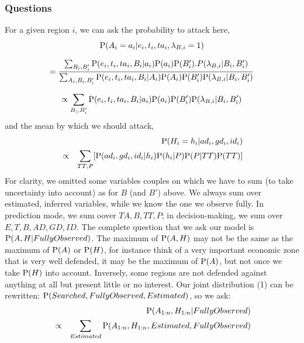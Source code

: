 \subsubsection{Questions}
For a given region $i$, we can ask the probability to attack here,
\begin{equation}
\mathrm{P}(A_i=a_i|e_i,t_i,ta_i,\lambda_{B,i}=1)
\end{equation}
\vspace{-0.2cm}
\begin{small}
\begin{equation}
= \frac{\sum_{B_i,B_i'}\mathrm{P}(e_i,t_i,ta_i,B_i|a_i)\mathrm{P}(a_i)\mathrm{P}(B_i').P(\lambda_{B,i}|B_i,B_i')}{\sum_{A_i,B_i,B_i'}\mathrm{P}(e_i,t_i,ta_i,B_i|A_i)\mathrm{P}(A_i)\mathrm{P}(B_i')\mathrm{P}(\lambda_{B,i}|B_i,B_i')}
\end{equation}
\end{small}
\vspace{-0.2cm}
\begin{equation}
\propto \sum_{B_i,B_i'}\mathrm{P}(e_i,t_i,ta_i,B_i|a_i)\mathrm{P}(a_i)\mathrm{P}(B_i')\mathrm{P}(\lambda_{B,i}|B_i,B_i')
\end{equation}
and the mean by which we should attack,
\begin{eqnarray}
& & \mathrm{P}(H_i=h_i|ad_i,gd_i,id_i) \\
& \propto & \sum_{TT,P}[\mathrm{P}(ad_i,gd_i,id_i|h_i)\mathrm{P}(h_i|P)\mathrm{P}(P|TT)\mathrm{P}(TT)]
\end{eqnarray}
For clarity, we omitted some variables couples on which we have to sum (to take uncertainty into account) as for $B$ (and $B'$) above. We always sum over estimated, inferred variables, while we know the one we observe fully. In prediction mode, we sum oover $TA,B,TT,P$; in decision-making, we sum over $E,T,B,AD,GD,ID$. 
The complete question that we ask our model is $\mathrm{P}(A,H|FullyObserved)$. The maximum of $\mathrm{P}(A,H)$ may not be the same as the maximum of $\mathrm{P}(A)$ or $\mathrm{P}(H)$, for instance think of a very important economic zone that is very well defended, it may be the maximum of $\mathrm{P}(A)$, but not once we take $\mathrm{P}(H)$ into account. Inversely, some regions are not defended against anything at all but present little or no interest. Our joint distribution (1) can be rewritten: $\mathrm{P}(Searched,FullyObserved,Estimated)$, so we ask:
\begin{eqnarray}
& & \mathrm{P}(A_{1:n},H_{1:n}|FullyObserved) \label{eqn:tacticsquestion}\\
& \propto & \sum_{Estimated}\mathrm{P}(A_{1:n},H_{1:n},Estimated,FullyObserved)
\end{eqnarray}


